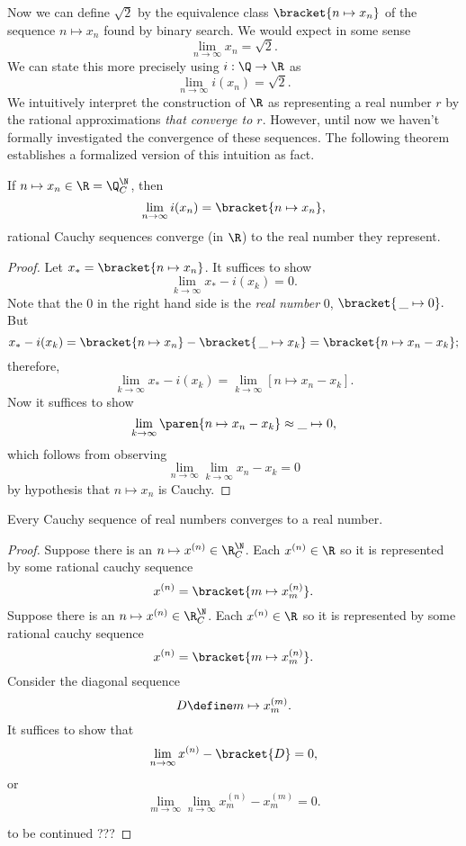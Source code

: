 \documentclass{scrartcl}
\begin{document}
Now we can define \(\sqrt 2\) by the equivalence class \(\bracket{n\mapsto x_{n}}\) of the sequence \(n\mapsto x_{n}\) found by binary search. We would expect in some sense
\[
  \lim_{{n\to\infty}}x_{n} = \sqrt 2.
\]
We can state this more precisely using \(i:\Q\to\R\) as
\[
  \lim_{n\to\infty}i(x_{n}) = \sqrt 2.
\]
We intuitively interpret the construction of \(\R\) as representing a real number \(r\) by the rational approximations \emph{that converge to \(r\)}. However, until now we haven't formally investigated the convergence of these sequences. The following theorem establishes a formalized version of this intuition as fact.
\begin{theorem}
  If \(n\mapsto x_{n} \in \R=\Q^{\N}_{C}\), then
  \[
    \lim_{n\to\infty} i(x_{n}) = \bracket{n\mapsto x_{n}},
  \]
  \ie{} rational Cauchy sequences converge (in \(\R\)) to the real number they represent.
\end{theorem}
\begin{proof}
  Let \(x_{*}=\bracket{n\mapsto x_{n}}\). It suffices to show
  \[
    \lim_{k\to\infty} x_{*}-i(x_{k}) = 0.
  \]
  Note that the \(0\) in the right hand side is the \emph{real number} \(0\), \ie{}
  \(
    \bracket{\,\_{}\mapsto 0}.
  \)
  But
  \[
    x_{*} - i(x_{k}) = \bracket{n \mapsto x_{n}}-\bracket{\,\_{}\mapsto x_{k}} = \bracket{n\mapsto x_{n}-x_{k}};
  \]
  therefore,
  \[
    \lim_{{k\to\infty}} x_{*}-i(x_{k}) = \lim_{k\to\infty} [n\mapsto x_{n}-x_{k}].
  \]
  Now it suffices to show
  \[
    \lim_{k\to\infty}\paren{n\mapsto x_{n} -x_{k}} \approx \_{}\mapsto0,
  \]
  which follows from observing
  \[
    \lim_{n\to\infty}\lim_{k\to\infty} x_{n}-x_{k} =0
  \]
  by hypothesis that \(n\mapsto x_{n}\) is Cauchy.
\end{proof}
\begin{theorem}
  Every Cauchy sequence of real numbers converges to a real number.
\end{theorem}
\begin{proof}
  Suppose there is an \(n\mapsto x^{(n)}\in \R^{\N}_{C}\). Each \(x^{(n)}\in \R\) so it is represented by some rational cauchy sequence
  \[
    x^{(n)} = \bracket{m\mapsto x^{(n)}_{m}}.
  \]
  Suppose there is an \(n\mapsto x^{(n)}\in \R^{\N}_{C}\). Each \(x^{(n)}\in \R\) so it is represented by some rational cauchy sequence
  \[
    x^{(n)} = \bracket{m\mapsto x^{(n)}_{m}}.
  \]
  Consider the diagonal sequence
  \[
    D\define m\mapsto x^{(m)}_{m}.
  \]
  It suffices to show that
  \[
    \lim_{n\to\infty}x^{(n)} - \bracket{D} = 0,
  \]
  or
  \[
    \lim_{m\to\infty}\lim_{n\to\infty} x^{(n)}_{m}-x^{(m)}_{m} = 0.
  \]


 to be continued ???

\end{proof}
\end{document}
